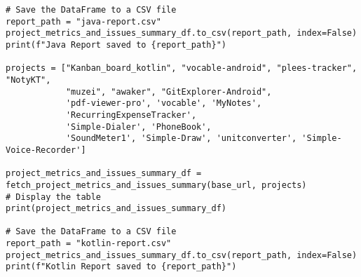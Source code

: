 \begin{lstlisting}
# Save the DataFrame to a CSV file
report_path = "java-report.csv"
project_metrics_and_issues_summary_df.to_csv(report_path, index=False)
print(f"Java Report saved to {report_path}")

projects = ["Kanban_board_kotlin", "vocable-android", "plees-tracker", "NotyKT",
            "muzei", "awaker", "GitExplorer-Android",
            'pdf-viewer-pro', 'vocable', 'MyNotes',
            'RecurringExpenseTracker',
            'Simple-Dialer', 'PhoneBook',
            'SoundMeter1', 'Simple-Draw', 'unitconverter', 'Simple-Voice-Recorder']

project_metrics_and_issues_summary_df = fetch_project_metrics_and_issues_summary(base_url, projects)
# Display the table
print(project_metrics_and_issues_summary_df)

# Save the DataFrame to a CSV file
report_path = "kotlin-report.csv"
project_metrics_and_issues_summary_df.to_csv(report_path, index=False)
print(f"Kotlin Report saved to {report_path}")

\end{lstlisting}



